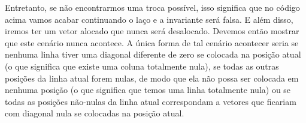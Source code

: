 Entretanto, se não encontrarmos uma troca possível, isso significa que
no código acima vamos acabar continuando o laço e a invariante será
falsa. E além disso, iremos ter um vetor alocado que nunca será
desalocado. Devemos então mostrar que este cenário nunca acontece. A
única forma de tal cenário acontecer seria se nenhuma linha tiver uma
diagonal diferente de zero se colocada na posição atual (o que
significa que existe uma coluna totalmente nula), se todas as outras
posições da linha atual forem nulas, de modo que ela não possa ser
colocada em nenhuma posição (o que significa que temos uma linha
totalmente nula) ou se todas as posições não-nulas da linha atual
correspondam a vetores que ficariam com diagonal nula se colocadas na
posição atual.

\fim


